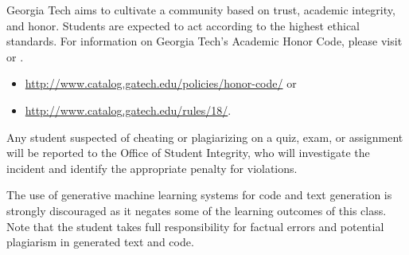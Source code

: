 Georgia Tech aims to cultivate a community based on trust, academic integrity, and honor. Students are expected to act according to the highest ethical standards.  For information on Georgia Tech's Academic Honor Code, please visit  or .

        \begin{itemize}
            \item \url{http://www.catalog.gatech.edu/policies/honor-code/} or
            \item \url{http://www.catalog.gatech.edu/rules/18/}.
        \end{itemize}
        
Any student suspected of cheating or plagiarizing on a quiz, exam, or assignment will be reported to the Office of Student Integrity, who will investigate the incident and identify the appropriate penalty for violations.

The use of generative machine learning systems for code and text generation is strongly discouraged as it negates some of the learning outcomes of this class. Note that the student takes full responsibility for factual errors and potential plagiarism in generated text and code.
